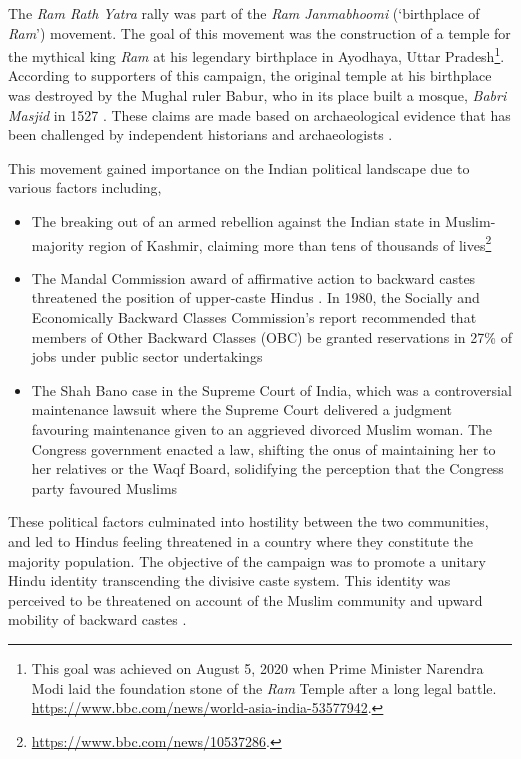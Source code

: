 \documentclass{article}
\begin{document}
The \emph{Ram Rath Yatra} rally was part of the \emph{Ram Janmabhoomi} (`birthplace of \emph{Ram}') movement. The goal of this movement was the construction of a temple for the mythical king \emph{Ram} at his legendary birthplace in Ayodhaya, Uttar Pradesh\footnote{This goal was achieved on August 5, 2020 when Prime Minister Narendra Modi laid the foundation stone of the \emph{Ram} Temple after a long legal battle. \url{https://www.bbc.com/news/world-asia-india-53577942}.}. According to supporters of this campaign, the original temple at his birthplace was destroyed by the Mughal ruler Babur, who in its place built a mosque, \emph{Babri Masjid} in 1527 \citep{ramjanmabhoomi}. These claims are made based on archaeological evidence that has been challenged by independent historians and archaeologists \citep{gopal1990political}.

This movement gained importance on the Indian political landscape due to various factors including,

\begin{itemize}
\item The breaking out of an armed rebellion against the Indian state in Muslim-majority region of Kashmir, claiming more than tens of thousands of lives\footnote{\url{https://www.bbc.com/news/10537286}.}

\item The Mandal Commission award of affirmative action to backward castes threatened the position of upper-caste Hindus \citep{balagopal1990anti}. In 1980, the Socially and Economically Backward Classes Commission's report recommended that members of Other Backward Classes (OBC) be granted reservations in 27\% of jobs under public sector undertakings

\item The Shah Bano case in the Supreme Court of India, which was a controversial maintenance lawsuit where the Supreme Court delivered a judgment favouring maintenance given to an aggrieved divorced Muslim woman. The Congress government enacted a law, shifting the onus of maintaining her to her relatives or the Waqf Board, solidifying the perception that the Congress party favoured Muslims \citep{pathak1989shahbano}
\end{itemize}

These political factors culminated into hostility between the two communities, and led to Hindus feeling threatened in a country where they constitute the majority population. The objective of the campaign was to promote a unitary Hindu identity transcending the divisive caste system. This identity was perceived to be threatened on account of the Muslim community and upward mobility of backward castes \citep{jaffrelot2010religion}. 
\end{document}
